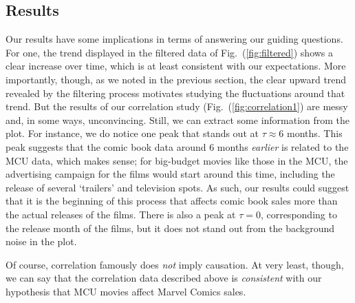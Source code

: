 \documentclass[12pt]{article}
\begin{document}
\subsection{Results}
Our results have some implications in terms of answering our guiding questions.  For one, the trend displayed in the filtered data of Fig.~(\ref{fig:filtered}) shows a clear increase over time, which is at least consistent with our expectations.  More importantly, though, as we noted in the previous section, the clear upward trend revealed by the filtering process motivates studying the fluctuations around that trend.  But the results of our correlation study (Fig.~(\ref{fig:correlation1}) are messy and, in some ways, unconvincing.  Still, we can extract some information from the plot.  For instance, we do notice one peak that stands out at $\tau\approx 6$ months.  This peak suggests that the comic book data around 6 months \textit{earlier} is related to the MCU data, which makes sense; for big-budget movies like those in the MCU, the advertising campaign for the films would start around this time, including the release of several `trailers' and television spots.  As such, our results could suggest that it is the beginning of this process that affects comic book sales more than the actual releases of the films.  There is also a peak at $\tau = 0$, corresponding to the release month of the films, but it does not stand out from the background noise in the plot.

Of course, correlation famously does \textit{not} imply causation.  At very least, though, we can say that the correlation data described above is \textit{consistent} with our hypothesis that MCU movies affect Marvel Comics sales.
\end{document}
